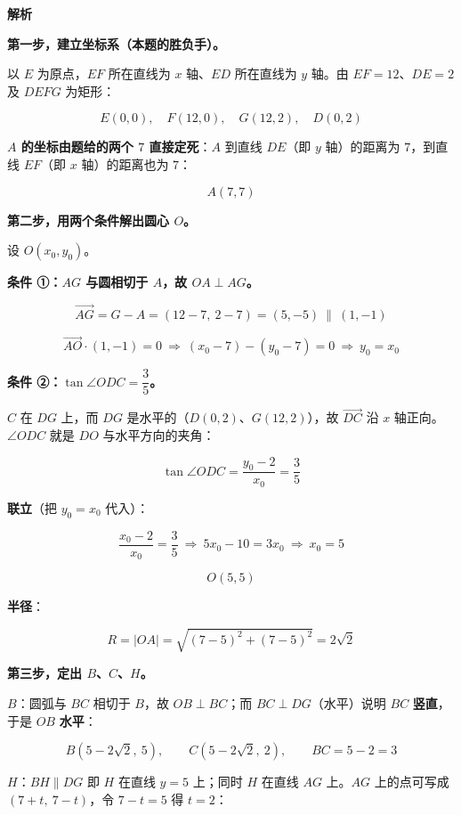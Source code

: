 \begin{center}\end{center}

\textbf{解析}

\textbf{第一步，建立坐标系（本题的胜负手）。}

以 $E$ 为原点，$EF$ 所在直线为 $x$ 轴、$ED$ 所在直线为 $y$ 轴。由 $EF=12$、$DE=2$ 及 $DEFG$ 为矩形：

\[E(0,0),\quad F(12,0),\quad G(12,2),\quad D(0,2)\]

\textbf{$A$ 的坐标由题给的两个 $7$ 直接定死}：$A$ 到直线 $DE$（即 $y$ 轴）的距离为 $7$，到直线 $EF$（即 $x$ 轴）的距离也为 $7$：

\[A(7,7)\]

\textbf{第二步，用两个条件解出圆心 $O$。}

设 $O\left(x_0,y_0\right)$。

\textbf{条件 ①：$AG$ 与圆相切于 $A$，故 $OA\perp AG$。}

\[\overrightarrow{AG}=G-A=(12-7,\ 2-7)=(5,-5)\ \parallel\ (1,-1)\]

\[\overrightarrow{AO}\cdot(1,-1)=0\ \Longrightarrow\ \left(x_0-7\right)-\left(y_0-7\right)=0\ \Longrightarrow\ y_0=x_0\]

\textbf{条件 ②：$\tan\angle ODC=\dfrac35$。}

$C$ 在 $DG$ 上，而 $DG$ 是水平的（$D(0,2)$、$G(12,2)$），故 $\overrightarrow{DC}$ 沿 $x$ 轴正向。$\angle ODC$ 就是 $DO$ 与水平方向的夹角：

\[\tan\angle ODC=\frac{y_0-2}{x_0}=\frac35\]

\textbf{联立}（把 $y_0=x_0$ 代入）：

\[\frac{x_0-2}{x_0}=\frac35\ \Longrightarrow\ 5x_0-10=3x_0\ \Longrightarrow\ x_0=5\]

\[\boxed{O(5,5)}\]

\textbf{半径}：

\[R=|OA|=\sqrt{(7-5)^{2}+(7-5)^{2}}=2\sqrt2\]

\textbf{第三步，定出 $B$、$C$、$H$。}

\textbf{$B$}：圆弧与 $BC$ 相切于 $B$，故 $OB\perp BC$；而 $BC\perp DG$（水平）说明 $BC$ \textbf{竖直}，于是 $OB$ \textbf{水平}：

\[B\left(5-2\sqrt2,\ 5\right),\qquad C\left(5-2\sqrt2,\ 2\right),\qquad BC=5-2=3\]

\textbf{$H$}：$BH\parallel DG$ 即 $H$ 在直线 $y=5$ 上；同时 $H$ 在直线 $AG$ 上。$AG$ 上的点可写成 $(7+t,\ 7-t)$，令 $7-t=5$ 得 $t=2$：

